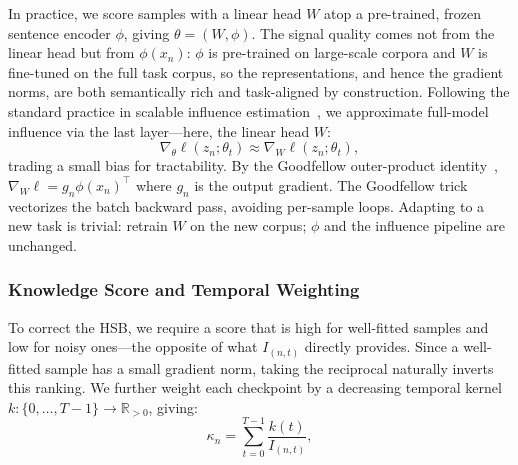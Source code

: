 \begin{foldable} 
  In practice, we score samples with a linear head $W$ atop a pre-trained, frozen sentence encoder $\phi$, giving $\theta = (W, \phi)$.
  The signal quality comes not from the linear head but from $\phi(x_n)$: $\phi$ is pre-trained on large-scale corpora and $W$ is fine-tuned on the full task corpus, so the representations, and hence the gradient norms, are both semantically rich and task-aligned by construction.
  Following the standard practice in scalable influence estimation~\cite{guo2021fastif}, we approximate full-model influence via the last layer---here, the linear head $W$:
  \begin{equation}
    \nabla_\theta \ell(z_n; \theta_t) \approx \nabla_W \ell(z_n; \theta_t),
    \label{eq:last-layer}
  \end{equation}
  trading a small bias for tractability.
  By the Goodfellow outer-product identity~\cite{goodfellow2015efficient}, $\nabla_W \ell = g_n \phi(x_n)^\top$ where $g_n$ is the output gradient.
  The Goodfellow trick vectorizes the batch backward pass, avoiding per-sample loops.
  Adapting to a new task is trivial: retrain $W$ on the new corpus; $\phi$ and the influence pipeline are unchanged.
\end{foldable}

\subsubsection{Knowledge Score and Temporal Weighting} \label{sec:53-research03-method-gradient-knowledge}
\begin{foldable} %
  To correct the \ac{HSB}, we require a score that is high for well-fitted samples and low for noisy ones---the opposite of what $I_{(n,t)}$ directly provides.
  Since a well-fitted sample has a small gradient norm, taking the reciprocal naturally inverts this ranking.
  We further weight each checkpoint by a decreasing temporal kernel $k : \{0,\ldots,T-1\} \to \mathbb{R}_{>0}$, giving:
  \begin{equation}
    \kappa_n = \sum_{t=0}^{T-1} \frac{k(t)}{I_{(n,t)}},
    \label{eq:kappa}
  \end{equation}
\end{foldable}

